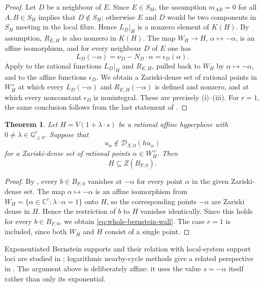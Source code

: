 \documentclass[12pt]{amsart}
\numberwithin{equation}{section}
\theoremstyle{plain}
\newtheorem{theorem}{Theorem}[section]
\theoremstyle{definition}
\theoremstyle{remark}
\theoremstyle{definition}
\newcommand{\C}{\mathbb C}
\newcommand{\Q}{\mathbb Q}
\newcommand{\D}{\mathscr D}
\begin{document}
\begin{proof}
Let $D$ be a neighbour of $E$. Since $E\in S_H$, the assumption $m_{AB}=0$ for all $A,B\in S_H$ implies that $D\notin S_H$; otherwise $E$ and $D$ would be two components in $S_H$ meeting in the local fibre. Hence $L_D|_H$ is a nonzero element of $K(H)$. By assumption, $R_{E,H}$ is also nonzero in $K(H)$. The map $W_H\to H$, $\alpha\mapsto-\alpha$, is an affine isomorphism, and for every neighbour $D$ of $E$ one has
\begin{equation*}
L_D(-\alpha)=\nu_D-N_D\cdot\alpha=\epsilon_D(\alpha).
\end{equation*}
Apply  to the rational functions $L_D|_H$ and $R_{E,H}$, pulled back to $W_H$ by $\alpha\mapsto-\alpha$, and to the affine functions $\epsilon_D$. We obtain a Zariski-dense set of rational points in $W_H^+$ at which every $L_D(-\alpha)$ and $R_{E,H}(-\alpha)$ is defined and nonzero, and at which every nonconstant $\epsilon_D$ is nonintegral. These are precisely \textup{(i)}--\textup{(iii)}. For $r=1$, the same conclusion follows from the last statement of .
\end{proof}


\begin{theorem}\label{thm:dense-wall-lifting}
Let $H=V(1+\lambda\cdot s)$ be a rational affine hyperplane with $0\ne\lambda\in\Q_{\ge0}^r$. Suppose that
\[
 u_\alpha\notin\D_{X,0}(hu_\alpha)
\]
for a Zariski-dense set of rational points $\alpha\in W_H^+$. Then
\begin{equation}\label{eq:whole-bernstein-wall}
 H\subseteq Z(B_{F,0}).
\end{equation}
\end{theorem}

\begin{proof}
By , every $b\in B_{F,0}$ vanishes at $-\alpha$ for every point $\alpha$ in the given Zariski-dense set. The map $\alpha\mapsto-\alpha$ is an affine isomorphism from $W_H=\{\alpha\in\C^r:\lambda\cdot\alpha=1\}$ onto $H$, so the corresponding points $-\alpha$ are Zariski dense in $H$. Hence the restriction of $b$ to $H$ vanishes identically. Since this holds for every $b\in B_{F,0}$, we obtain \eqref{eq:whole-bernstein-wall}. The case $r=1$ is included, since both $W_H$ and $H$ consist of a single point.
\end{proof}

Exponentiated Bernstein supports and their relation with local-system support loci are studied in \cite{BvdVWZ2021}; logarithmic nearby-cycle methods give a related perspective in \cite{Wu2026}. The argument above is deliberately affine: it uses the value $s=-\alpha$ itself rather than only its exponential.
\end{document}

